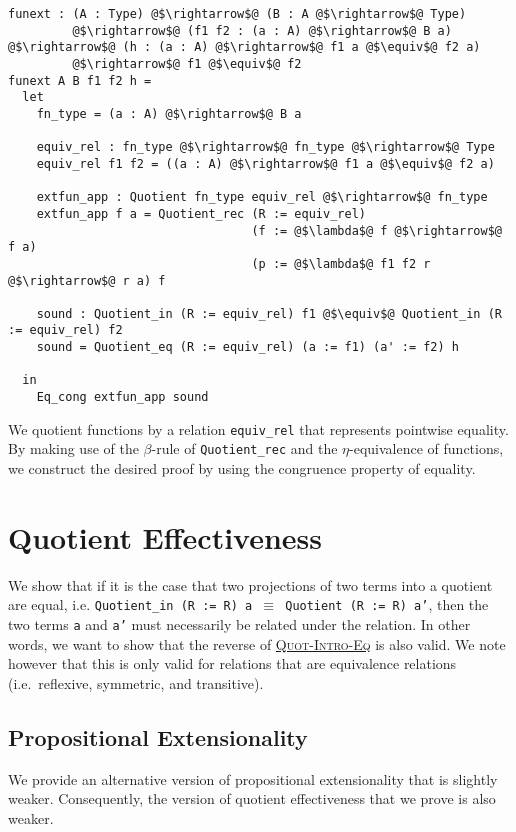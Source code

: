\documentclass[12pt,twoside,maitrise]{dms}
\theoremstyle{definition}
\numberwithin{equation}{section}
\numberwithin{table}{chapter}
\numberwithin{figure}{chapter}
\newcommand\id[1] {\texttt{#1}}
\newcommand\fn[1] {\texttt{#1}}
\begin{document}
\begin{verbatim}
funext : (A : Type) @$\rightarrow$@ (B : A @$\rightarrow$@ Type)
         @$\rightarrow$@ (f1 f2 : (a : A) @$\rightarrow$@ B a) @$\rightarrow$@ (h : (a : A) @$\rightarrow$@ f1 a @$\equiv$@ f2 a)
         @$\rightarrow$@ f1 @$\equiv$@ f2
funext A B f1 f2 h =
  let
    fn_type = (a : A) @$\rightarrow$@ B a

    equiv_rel : fn_type @$\rightarrow$@ fn_type @$\rightarrow$@ Type
    equiv_rel f1 f2 = ((a : A) @$\rightarrow$@ f1 a @$\equiv$@ f2 a)

    extfun_app : Quotient fn_type equiv_rel @$\rightarrow$@ fn_type
    extfun_app f a = Quotient_rec (R := equiv_rel)
                                  (f := @$\lambda$@ f @$\rightarrow$@ f a)
                                  (p := @$\lambda$@ f1 f2 r @$\rightarrow$@ r a) f

    sound : Quotient_in (R := equiv_rel) f1 @$\equiv$@ Quotient_in (R := equiv_rel) f2
    sound = Quotient_eq (R := equiv_rel) (a := f1) (a' := f2) h

  in
    Eq_cong extfun_app sound
\end{verbatim}

We quotient functions by a relation \id{equiv\_rel} that represents pointwise
equality. By making use of the $\beta$-rule of \id{Quotient\_rec} and the
$\eta$-equivalence of functions, we construct the desired proof by using the
congruence property of equality.

\chapter{Quotient Effectiveness}\label{ch:quotient-effectiveness}

We show that if it is the case that two projections of two terms into a quotient
are equal, i.e. \fn{Quotient_in (R := R) a $\equiv$ Quotient (R := R) a'}, then
the two terms \id{a} and \id{a'} must necessarily be related under the relation.
In other words, we want to show that the reverse of
\hyperref[quot-intro-eq-rule]{\textsc{Quot-Intro-Eq}} is also valid. We note
however that this is only valid for relations that are equivalence relations
(i.e.\ reflexive, symmetric, and transitive).

\section{Propositional Extensionality}
We provide an alternative version of propositional extensionality that is
slightly weaker. Consequently, the version of quotient effectiveness that we
prove is also weaker.
\end{document}
